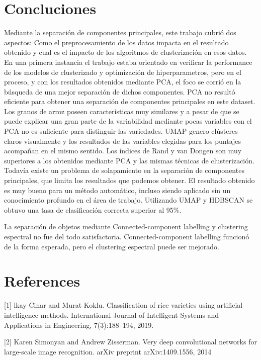 \documentclass{article}
\begin{document}
\section{Concluciones}
Mediante la separación de componentes principales, este trabajo cubrió dos aspectos: Como el preprocesamiento de los datos impacta en el resultado obtenido y cual es el impacto de los algoritmos de clusterización en esos datos. En una primera instancia el trabajo estaba orientado en verificar la performance de los modelos de clusterizado y optimización de hiperparametros, pero en el proceso, y con los resultados obtenidos mediante PCA, el foco se corrió en la búsqueda de una mejor separación de dichos componentes.
PCA no resultó eficiente para obtener una separación de componentes principales en este dataset. Los granos de arroz poseen características muy similares y a pesar de que se puede explicar una gran parte de la variabilidad mediante pocas variables con el PCA no es suficiente para distinguir las variedades.
UMAP genero clústeres claros visualmente y los resultados de las variables elegidas para los puntajes acompañan en el mismo sentido. Los índices de Rand y van Dongen son muy superiores a los obtenidos mediante PCA y las mismas técnicas de clusterización. Todavía existe un problema de solapamiento en la separación de componentes principales, que limita los resultados que podemos obtener. El resultado obtenido es muy bueno para un método automático, incluso siendo aplicado sin un conocimiento profundo en el área de trabajo. Utilizando UMAP y HDBSCAN se obtuvo una tasa de clasificación correcta superior al 95\%.

La separación de objetos mediante Connected-component labelling y clustering espectral no fue del todo satisfactoria. Connected-component labelling funcionó de la forma esperada, pero el clustering espectral puede ser mejorado.


\section*{References}

\medskip
\small

[1] lkay Cinar and Murat Koklu. Classification of rice varieties using artificial intelligence methods.
International Journal of Intelligent Systems and Applications in Engineering, 7(3):188–194,
2019.

[2] Karen Simonyan and Andrew Zisserman. Very deep convolutional networks for large-scale image
recognition. arXiv preprint arXiv:1409.1556, 2014
\end{document}
